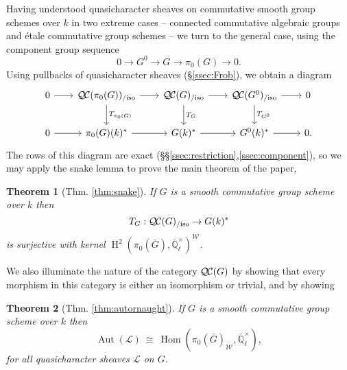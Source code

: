 \documentclass[CM,Submssn,SecEq]{degruyter-crelle} %
\theoremstyle{plain}
\newtheorem*{theorem*}{Theorem}
\theoremstyle{definition}
\theoremstyle{remark}
\newcommand{\EE}{\mathbb{\bar Q}_\ell}
\newcommand{\Fq}{k}
\newcommand{\EEx}{\EE^\times}
\newcommand{\Weil}[1]{\mathcal{W}_{#1}}
\DeclareMathOperator{\Aut}{Aut}
\DeclareMathOperator{\Hom}{Hom}
\DeclareMathOperator{\Hh}{H}
\newcommand{\iso}{{\ \cong\ }}
\newcommand{\TrFrob}[1]{T_{#1}}
\newcommand{\qcs}[1]{{\mathcal{#1}}}
\newcommand{\QC}{{\mathcal{Q\hskip-0.8pt C}}}
\newcommand{\QCiso}[1]{\QC(#1)_{/\text{iso}}}
\newcommand{\bG}{\bar{G}}
\begin{document}
Having understood quasicharacter sheaves on commutative smooth group schemes over $\Fq$ in two extreme cases --
connected commutative algebraic groups and \'etale commutative group schemes -- we turn to the general case, using the component group sequence
\[
0 \to G^0 \to G \to \pi_0(G) \to 0.
\]
Using pullbacks of quasicharacter sheaves (\S\ref{ssec:Frob}), we obtain a diagram
\[
  \begin{tikzcd}[row sep=20, column sep=20]
    0 \rar & \QCiso{\pi_0(G)} \rar \dar{\TrFrob{\pi_0(G)}}
    & \QCiso{G} \rar \dar{\TrFrob{G}} & \QCiso{G^0} \rar \dar{\TrFrob{G^0}} & 0\\
    0 \rar & \pi_0(G)(\Fq)^* \rar & G(\Fq)^* \rar & G^0(\Fq)^* \rar & 0.
  \end{tikzcd}
\]
The rows of this diagram are exact (\S\S\ref{ssec:restriction},\ref{ssec:component}), so we may apply the snake lemma to prove the main theorem of the paper,
\begin{theorem*}[{Thm. \ref{thm:snake}}]
If $G$ is a smooth commutative group scheme over $\Fq$ then
\[
\TrFrob{G} : \QCiso{G} \to G(\Fq)^*
\]
is surjective with kernel $\Hh^2(\pi_0(\bG),\EEx)^{\Weil{}}$.
\end{theorem*}
We also illuminate the nature of the category $\QC(G)$ by showing that every morphism in this category is either an isomorphism or trivial, and by showing
\begin{theorem*}[{Thm. \ref{thm:autornaught}}]
If $G$ is a smooth commutative group scheme over $\Fq$ then
\[
\Aut(\qcs{L}) \iso \Hom(\pi_0(\bG)_{\Weil{}},\EEx),
\]
for all quasicharacter sheaves $\qcs{L}$ on $G$.
\end{theorem*}


\end{document}
